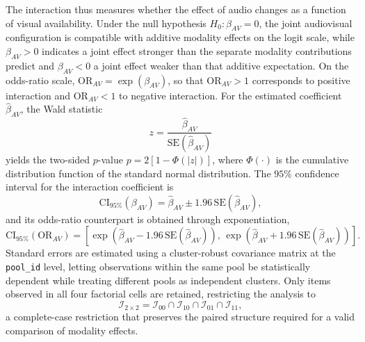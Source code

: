 \begin{description}
The interaction thus measures whether the effect of audio changes as a function of visual availability. Under the null hypothesis \(H_0: \beta_{AV}=0\), the joint audiovisual configuration is compatible with additive modality effects on the logit scale, while \(\beta_{AV}>0\) indicates a joint effect stronger than the separate modality contributions predict and \(\beta_{AV}<0\) a joint effect weaker than that additive expectation.
On the odds-ratio scale, \(\mathrm{OR}_{AV} = \exp\left(\beta_{AV}\right)\), so that \(\mathrm{OR}_{AV}>1\) corresponds to positive interaction and \(\mathrm{OR}_{AV}<1\) to negative interaction.
For the estimated coefficient \(\hat{\beta}_{AV}\), the Wald statistic
\begin{equation}
z
=
\frac{
\hat{\beta}_{AV}
}{
\mathrm{SE}
\left(
\hat{\beta}_{AV}
\right)
}
\end{equation}
yields the two-sided \(p\)-value \(p = 2\left[1-\Phi\left(|z|\right)\right]\), where \(\Phi(\cdot)\) is the cumulative distribution function of the standard normal distribution. The \(95\%\) confidence interval for the interaction coefficient is
\begin{equation}
\mathrm{CI}_{95\%}
\left(
\beta_{AV}
\right)
=
\hat{\beta}_{AV}
\pm
1.96
\,
\mathrm{SE}
\left(
\hat{\beta}_{AV}
\right),
\end{equation}
and its odds-ratio counterpart is obtained through exponentiation,
\begin{equation}
\mathrm{CI}_{95\%}
\left(
\mathrm{OR}_{AV}
\right)
=
\left[
\exp
\left(
\hat{\beta}_{AV}
-
1.96\,\mathrm{SE}
\left(
\hat{\beta}_{AV}
\right)
\right),
\,
\exp
\left(
\hat{\beta}_{AV}
+
1.96\,\mathrm{SE}
\left(
\hat{\beta}_{AV}
\right)
\right)
\right].
\end{equation}
Standard errors are estimated using a cluster-robust covariance matrix at the \texttt{pool\_id} level, letting observations within the same pool be statistically dependent while treating different pools as independent clusters. Only items observed in all four factorial cells are retained, restricting the analysis to
\begin{equation}
\mathcal{I}_{2\times2}
=
\mathcal{I}_{00}
\cap
\mathcal{I}_{10}
\cap
\mathcal{I}_{01}
\cap
\mathcal{I}_{11},
\end{equation}
a complete-case restriction that preserves the paired structure required for a valid comparison of modality effects.
\end{description}
